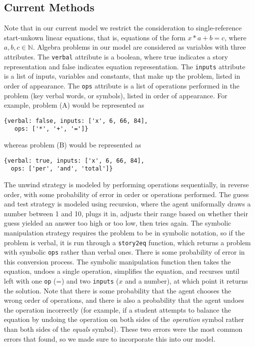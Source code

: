 \documentclass[10pt,letterpaper]{article}
\begin{document}
\subsection{Current Methods}

Note that in our current model we restrict the consideration to single-reference start-unkown linear equations, that is, equations of the form $x*a+b=c$, where $a,b,c\in\mathbb{N}$. Algebra problems in our model are considered as variables with three attributes. The \verb|verbal| attribute is a boolean, where true indicates a story representation and false indicates equation representation. The \verb|inputs| attribute is a list of inputs, variables and constants, that make up the problem, listed in order of appearance. The \verb|ops| attribute is a list of operations performed in the problem (key verbal words, or symbols), listed in order of appearance.
For example, problem (A) would be represented as 
\begin{verbatim}
{verbal: false, inputs: ['x', 6, 66, 84], 
   ops: ['*', '+', '=']}
\end{verbatim}
whereas problem (B) would be represented as
\begin{verbatim}
{verbal: true, inputs: ['x', 6, 66, 84], 
  ops: ['per', 'and', 'total']}
\end{verbatim}

The unwind strategy is modeled by performing operations sequentially, in reverse order, with some probability of error in order or operations performed. The guess and test strategy is modeled using recursion, where the agent uniformally draws a number between 1 and 10, plugs it in, adjusts their range based on whether their guess yielded an answer too high or too low, then tries again. The symbolic manipulation strategy requires the problem to be in symbolic notation, so if the problem is verbal, it is run through a \verb|story2eq| function, which returns a problem with symbolic \verb|ops| rather than verbal ones. There is some probability of error in this conversion process. The symbolic manipulation function then takes the equation, undoes a single operation, simplifies the equation, and recurses until left with one \verb|op| (=) and two \verb|inputs| ($x$ and a number), at which point it returns the solution. Note that there is some probability that the agent chooses the wrong order of operations, and there is also a probability that the agent undoes the operation incorrectly (for example, if a student attempts to balance the equation by undoing the operation on both sides of the \textit{operation} symbol rather than both sides of the \textit{equals} symbol). These two errors were the most common errors that  found, so we made sure to incorporate this into our model.
\end{document}
